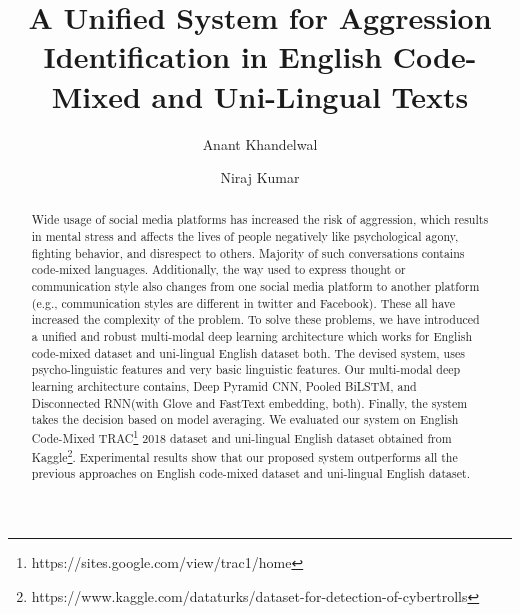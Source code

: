 \documentclass[sigconf]{acmart}
\begin{document}
\title{A Unified System for Aggression Identification in English Code-Mixed and Uni-Lingual Texts}



\author{Anant Khandelwal}

\author{Niraj Kumar}
\renewcommand{\shortauthors}{Anant Khandelwal and Niraj Kumar}

\begin{abstract}
  Wide usage of social media platforms has increased the risk of aggression, which results in mental stress and affects the lives of people negatively like psychological agony, fighting behavior, and disrespect to others. Majority of such conversations contains code-mixed languages\cite{kumar2018aggression}. Additionally, the way used to express thought or communication style also changes from one social media platform to another platform (e.g., communication styles are different in twitter and Facebook). These all have increased the complexity of the problem. To solve these problems, we have introduced a unified and robust multi-modal deep learning architecture which works for English code-mixed dataset and uni-lingual English dataset both. The devised system, uses psycho-linguistic features and very basic linguistic features. Our multi-modal deep learning architecture contains, Deep Pyramid CNN, Pooled BiLSTM, and Disconnected RNN(with Glove and FastText embedding, both). Finally, the system takes the decision based on model averaging. We evaluated our system on English Code-Mixed TRAC\footnote{https://sites.google.com/view/trac1/home} 2018 dataset and uni-lingual English dataset obtained from Kaggle\footnote{https://www.kaggle.com/dataturks/dataset-for-detection-of-cybertrolls}. Experimental results show that our proposed system outperforms all the previous approaches on English code-mixed dataset and uni-lingual English dataset.  
\end{abstract}





\maketitle
\end{document}
